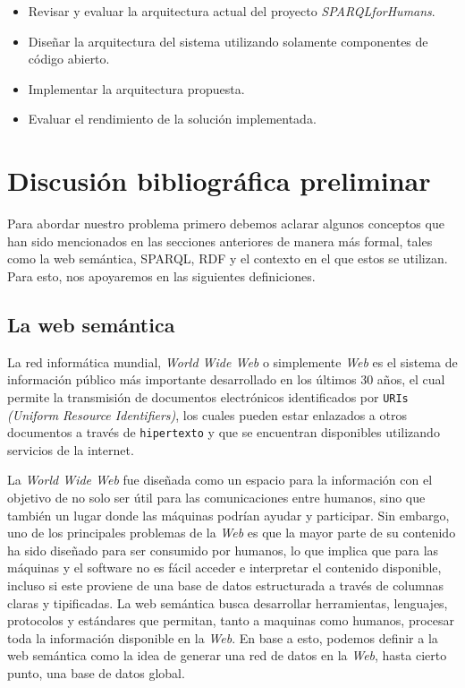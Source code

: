 \documentclass[conference,compsoc]{IEEEtran}
\begin{document}
\begin{itemize}
    \item Revisar y evaluar la arquitectura actual del proyecto \textit{SPARQLforHumans}.
    \item Diseñar la arquitectura del sistema utilizando solamente componentes de código abierto.
    \item Implementar la arquitectura propuesta.
    \item Evaluar el rendimiento de la solución implementada.
\end{itemize}

\section{Discusión bibliográfica preliminar}

Para abordar nuestro problema primero debemos aclarar algunos conceptos que han sido
mencionados en las secciones anteriores de manera más formal, tales como la web semántica, SPARQL, RDF y el
contexto en el que estos se utilizan. Para esto, nos apoyaremos en las siguientes definiciones.

    \subsection{La web semántica}

La red informática mundial, \textit{World Wide Web} o simplemente \textit{Web} es el sistema de información público más importante
desarrollado en los últimos 30 años, el cual permite la transmisión de documentos electrónicos identificados
por \texttt{URIs} \textit{(Uniform Resource Identifiers)}, los cuales pueden estar enlazados a otros documentos
a través de \texttt{hipertexto} y que se encuentran disponibles utilizando servicios de la internet.

La \textit{World Wide Web} fue diseñada como un espacio para la información con el objetivo de no solo ser
útil para las comunicaciones entre humanos, sino que también un lugar donde las máquinas podrían ayudar y participar.
Sin embargo, uno de los principales problemas de la \textit{Web} es que la mayor parte de su contenido ha sido
diseñado para ser consumido por humanos, lo que implica que para las máquinas y el software no es fácil acceder 
e interpretar el contenido disponible, incluso si este proviene de una base de datos estructurada a través de
columnas claras y tipificadas. La web semántica busca desarrollar herramientas,
lenguajes, protocolos y estándares que permitan, tanto a maquinas como humanos, procesar toda la información disponible en la
\textit{Web}. En base a esto, podemos definir a la web semántica como la idea de generar
una red de datos en la \textit{Web}, hasta cierto punto, una base de datos global. \cite{berners1998semantic}
\end{document}
